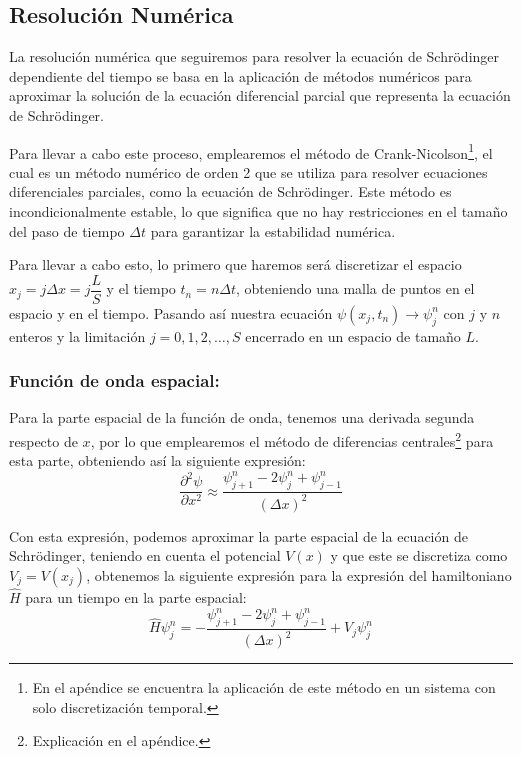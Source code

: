 \documentclass[10pt,onecolumn]{article}
\begin{document}
\subsection{Resolución Numérica}

La resolución numérica que seguiremos para resolver la ecuación de Schrödinger dependiente del tiempo se basa en la aplicación de métodos numéricos para aproximar la solución de la ecuación diferencial parcial que representa la ecuación de Schrödinger.


Para llevar a cabo este proceso, emplearemos el método de Crank-Nicolson\footnote{En el apéndice se encuentra la aplicación de este método en un sistema con solo discretización temporal.}, el cual es un método numérico de orden 2 que se utiliza para resolver ecuaciones diferenciales parciales, como la ecuación de Schrödinger. Este método es incondicionalmente estable, lo que significa que no hay restricciones en el tamaño del paso de tiempo $\Delta t$ para garantizar la estabilidad numérica. 


Para llevar a cabo esto, lo primero que haremos será discretizar el espacio $x_j = j\Delta x = j \dfrac{L}{S}$ y el tiempo $t_n = n\Delta t$, obteniendo una malla de puntos en el espacio y en el tiempo. Pasando así nuestra ecuación $\psi(x_j,t_n) \rightarrow \psi_{j}^{n}$ con $j$ y $n$ enteros y la limitación $j = 0, 1, 2, \ldots, S$ encerrado en un espacio de tamaño $L$.

\subsubsection{Función de onda espacial:}

Para la parte espacial de la función de onda, tenemos una derivada segunda respecto de $x$, por lo que emplearemos el método de diferencias centrales\footnote{Explicación en el apéndice.} para esta parte, obteniendo así la siguiente expresión:
\begin{equation}
    \dfrac{\partial^2 \psi}{\partial x^2} \approx \dfrac{\psi_{j+1}^{n} - 2\psi_{j}^{n} + \psi_{j-1}^{n}}{(\Delta x)^2}
\end{equation}

Con esta expresión, podemos aproximar la parte espacial de la ecuación de Schrödinger, teniendo en cuenta el potencial $V(x)$ y que este se discretiza como $V_{j} = V(x_j)$, obtenemos la siguiente expresión para la expresión del hamiltoniano $\hat{H}$ para un tiempo en la parte espacial:
\begin{equation}
    \hat{H} \psi_{j}^{n} = -\dfrac{\psi_{j+1}^{n} - 2\psi_{j}^{n} + \psi_{j-1}^{n}}{(\Delta x)^2} + V_{j} \psi_{j}^{n}
\end{equation}
\end{document}
